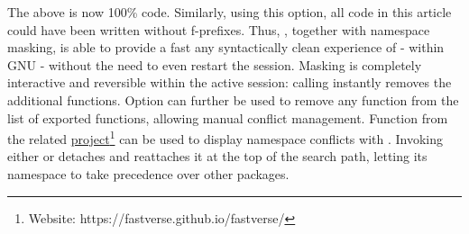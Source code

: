 \documentclass[article]{jss}
\begin{document}
The above is now 100\%  code. Similarly, using this option, all code in this article could have been written without f-prefixes. Thus, , together with namespace masking, is able to provide a fast any syntactically clean experience of  - within GNU  - without the need to even restart the session. Masking is completely interactive and reversible within the active session: calling  instantly removes the additional functions. Option  can further be used to remove any  function from the list of exported functions, allowing manual conflict management. Function  from the related \href{https://fastverse.github.io/fastverse/}{ project}\footnote{Website: https://fastverse.github.io/fastverse/} can be used to display namespace conflicts with . Invoking either  or  detaches  and reattaches it at the top of the search path, letting its namespace to take precedence over other packages.
%
\end{document}
